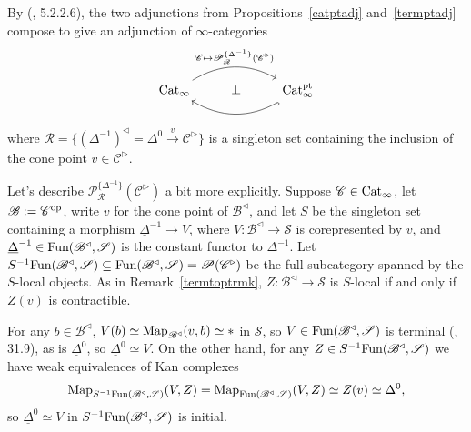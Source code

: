 \documentclass{tac}
\newcommand{\s}[1]{\mathscr{#1}}
\newcommand{\maybehat}[1]{#1} %
\newcommand{\tx}[1]{\textnormal{#1}}
\newcommand{\ul}[1]{\underline{#1}}
\begin{document}
\begin{rmk}\label{ptunptadjunctionremark} By (\cite{htt}, 5.2.2.6), the two adjunctions from Propositions~\ref{catptadj} and~\ref{termptadj} compose to give an adjunction of $\infty$-categories \[\begin{tikzcd}\maybehat{\tx{Cat}}_\infty \arrow[bend left]{rr}{\s{C} \mapsto \s{P}^{\{ \Delta^{-1} \}}_{\s{R}}(\s{C}^\triangleright)} & \perp & \maybehat{\tx{Cat}}_\infty^\tx{pt} \arrow[hook, bend left]{ll} \end{tikzcd}\]
where $\s{R} = \{ (\Delta^{-1})^\triangleleft = \Delta^0 \xrightarrow{v} \s{C}^\triangleright \}$ is a singleton set containing the inclusion of the cone point $v \in \s{C}^\triangleright$.  

Let's describe $ \s{P}^{\{ \Delta^{-1} \}}_{\s{R}}(\s{C}^\triangleright)$ a bit more explicitly.  Suppose $\s{C} \in \maybehat{\tx{Cat}}_\infty$, let $\s{B}:= \s{C}^\tx{op}$, write $v$ for the cone point of $\s{B}^\triangleleft$, and let $S$ be the singleton set containing a morphism $\ul{\Delta}^{-1} \to V$, where $V : \s{B}^\triangleleft \to \s{S}$ is corepresented by $v$, and $\ul{\Delta}^{-1} \in \tx{Fun}(\s{B}^\triangleleft , \s{S})$ is the constant functor to $\Delta^{-1}$.  Let $S^{-1} \tx{Fun}(\s{B}^\triangleleft , \s{S}) \subseteq \tx{Fun}(\s{B}^\triangleleft , \s{S}) = \s{P}(\s{C}^\triangleright)$ be the full subcategory spanned by the $S$-local objects.  As in Remark~\ref{termtoptrmk}, $Z : \s{B}^\triangleleft \to \s{S}$ is $S$-local if and only if $Z(v)$ is contractible.

For any $b \in \s{B}^\triangleleft $, $V(b) \simeq \tx{Map}_{\s{B}^\triangleleft} (v,b) \simeq *$ in $\s{S}$, so $V \in \tx{Fun}(\s{B}^\triangleleft , \s{S})$ is terminal (\cite{rezk}, 31.9), as is $\ul{\Delta}^0$, so $\ul{\Delta}^{0} \simeq V$.  On the other hand, for any $Z\in S^{-1} \tx{Fun}(\s{B}^\triangleleft , \s{S})$ we have weak equivalences of Kan complexes
\[ \tx{Map}_{S^{-1} \tx{Fun}(\s{B}^\triangleleft , \s{S})} (V,Z) = \tx{Map}_{\tx{Fun}(\s{B}^\triangleleft , \s{S})} (V,Z) \simeq Z(v) \simeq \Delta^0, \]
so $\ul{\Delta}^{0} \simeq V$ in $S^{-1} \tx{Fun}(\s{B}^\triangleleft , \s{S})$ is initial.  


\end{rmk}
\end{document}
